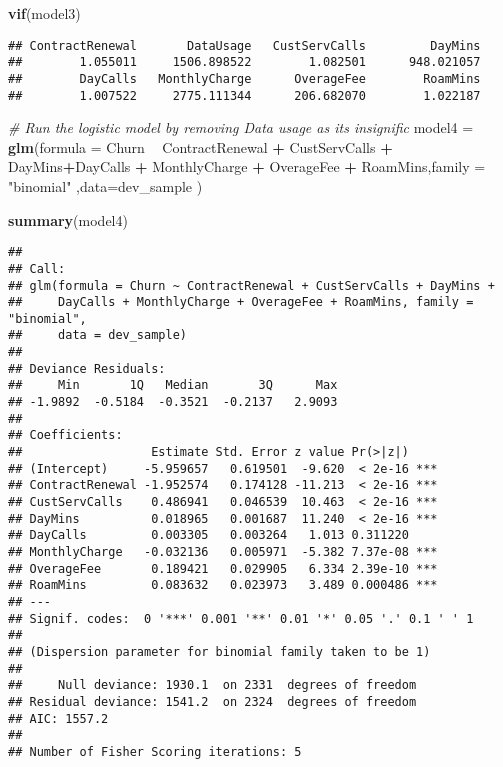 \documentclass[]{article}
\newenvironment{Shaded}{\begin{snugshade}}{\end{snugshade}}
\newcommand{\KeywordTok}[1]{\textcolor[rgb]{0.13,0.29,0.53}{\textbf{#1}}}
\newcommand{\DataTypeTok}[1]{\textcolor[rgb]{0.13,0.29,0.53}{#1}}
\newcommand{\StringTok}[1]{\textcolor[rgb]{0.31,0.60,0.02}{#1}}
\newcommand{\CommentTok}[1]{\textcolor[rgb]{0.56,0.35,0.01}{\textit{#1}}}
\newcommand{\OperatorTok}[1]{\textcolor[rgb]{0.81,0.36,0.00}{\textbf{#1}}}
\newcommand{\NormalTok}[1]{#1}
\begin{document}
\begin{Shaded}
\begin{Highlighting}[]
\KeywordTok{vif}\NormalTok{(model3)  }
\end{Highlighting}
\end{Shaded}

\begin{verbatim}
## ContractRenewal       DataUsage   CustServCalls         DayMins 
##        1.055011     1506.898522        1.082501      948.021057 
##        DayCalls   MonthlyCharge      OverageFee        RoamMins 
##        1.007522     2775.111344      206.682070        1.022187
\end{verbatim}

\begin{Shaded}
\begin{Highlighting}[]
  \CommentTok{# Run the logistic model by removing Data usage  as its insignific}
\NormalTok{  model4 =}\StringTok{ }\KeywordTok{glm}\NormalTok{(}\DataTypeTok{formula =}\NormalTok{ Churn }\OperatorTok{~}\StringTok{    }\NormalTok{ContractRenewal  }\OperatorTok{+}\StringTok{ }\NormalTok{CustServCalls }\OperatorTok{+}\StringTok{ }\NormalTok{DayMins}\OperatorTok{+}\NormalTok{DayCalls }\OperatorTok{+}\StringTok{ }\NormalTok{MonthlyCharge }\OperatorTok{+}\StringTok{ }\NormalTok{OverageFee }\OperatorTok{+}\StringTok{ }\NormalTok{RoamMins,}\DataTypeTok{family =} \StringTok{"binomial"}\NormalTok{ ,}\DataTypeTok{data=}\NormalTok{dev_sample )}

  \KeywordTok{summary}\NormalTok{(model4)  }
\end{Highlighting}
\end{Shaded}

\begin{verbatim}
## 
## Call:
## glm(formula = Churn ~ ContractRenewal + CustServCalls + DayMins + 
##     DayCalls + MonthlyCharge + OverageFee + RoamMins, family = "binomial", 
##     data = dev_sample)
## 
## Deviance Residuals: 
##     Min       1Q   Median       3Q      Max  
## -1.9892  -0.5184  -0.3521  -0.2137   2.9093  
## 
## Coefficients:
##                  Estimate Std. Error z value Pr(>|z|)    
## (Intercept)     -5.959657   0.619501  -9.620  < 2e-16 ***
## ContractRenewal -1.952574   0.174128 -11.213  < 2e-16 ***
## CustServCalls    0.486941   0.046539  10.463  < 2e-16 ***
## DayMins          0.018965   0.001687  11.240  < 2e-16 ***
## DayCalls         0.003305   0.003264   1.013 0.311220    
## MonthlyCharge   -0.032136   0.005971  -5.382 7.37e-08 ***
## OverageFee       0.189421   0.029905   6.334 2.39e-10 ***
## RoamMins         0.083632   0.023973   3.489 0.000486 ***
## ---
## Signif. codes:  0 '***' 0.001 '**' 0.01 '*' 0.05 '.' 0.1 ' ' 1
## 
## (Dispersion parameter for binomial family taken to be 1)
## 
##     Null deviance: 1930.1  on 2331  degrees of freedom
## Residual deviance: 1541.2  on 2324  degrees of freedom
## AIC: 1557.2
## 
## Number of Fisher Scoring iterations: 5
\end{verbatim}
\end{document}
